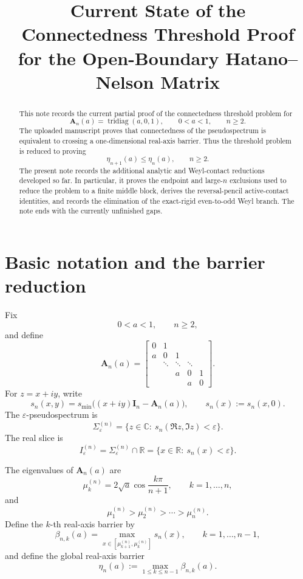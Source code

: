 \documentclass[11pt]{article}
\title{Current State of the Connectedness Threshold Proof\\
for the Open-Boundary Hatano--Nelson Matrix}
\author{}
\date{}
\numberwithin{equation}{section}
\begin{document}
\maketitle

\begin{abstract}
This note records the current partial proof of the connectedness threshold problem
for
\[
\mathbf A_n(a)=\operatorname{tridiag}(a,0,1),\qquad 0<a<1,\qquad n\ge2.
\]
The uploaded manuscript proves that connectedness of the pseudospectrum is
equivalent to crossing a one-dimensional real-axis barrier. Thus the threshold
problem is reduced to proving
\[
\eta_{n+1}(a)\le \eta_n(a),\qquad n\ge2.
\]
The present note records the additional analytic and Weyl-contact reductions
developed so far. In particular, it proves the endpoint and large-\(n\) exclusions
used to reduce the problem to a finite middle block, derives the reversal-pencil
active-contact identities, and records the elimination of the exact-rigid
even-to-odd Weyl branch. The note ends with the currently unfinished gaps.
\end{abstract}

\tableofcontents

\section{Basic notation and the barrier reduction}

Fix
\[
0<a<1,\qquad n\ge2,
\]
and define
\[
\mathbf A_n(a)=
\begin{bmatrix}
0&1\\
a&0&1\\
&\ddots&\ddots&\ddots\\
&&a&0&1\\
&&&a&0
\end{bmatrix}.
\]
For \(z=x+iy\), write
\[
s_n(x,y)
=
s_{\min}\!\bigl((x+iy)\mathbf I_n-\mathbf A_n(a)\bigr),
\qquad
s_n(x):=s_n(x,0).
\]
The \(\varepsilon\)-pseudospectrum is
\[
\Sigma_\varepsilon^{(n)}
=
\{z\in\mathbb C:\ s_n(\Re z,\Im z)<\varepsilon\}.
\]
The real slice is
\[
I_\varepsilon^{(n)}
=
\Sigma_\varepsilon^{(n)}\cap\mathbb R
=
\{x\in\mathbb R:\ s_n(x)<\varepsilon\}.
\]

The eigenvalues of \(\mathbf A_n(a)\) are
\[
\mu_k^{(n)}
=
2\sqrt a\cos\frac{k\pi}{n+1},
\qquad k=1,\dots,n,
\]
and
\[
\mu_1^{(n)}>\mu_2^{(n)}>\cdots>\mu_n^{(n)}.
\]
Define the \(k\)-th real-axis barrier by
\[
\beta_{n,k}(a)
=
\max_{x\in[\mu_{k+1}^{(n)},\mu_k^{(n)}]}s_n(x),
\qquad k=1,\dots,n-1,
\]
and define the global real-axis barrier
\[
\eta_n(a):=\max_{1\le k\le n-1}\beta_{n,k}(a).
\]
\end{document}
